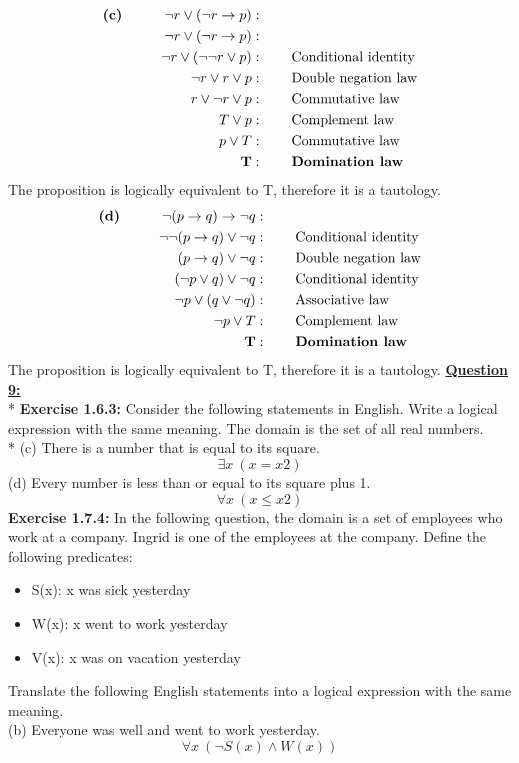 \documentclass[12pt, letterpaper, twoside]{article}
\begin{document}
\begin{align*}
\text{\textbf{(c)}} \quad\qquad \neg{r} \lor (\neg{r} \to p) &:\\
\neg{r} \lor (\neg{r} \to p) &:\\
\neg{r} \lor (\neg{\neg{r}} \lor p)		&:\qquad \text{Conditional identity}\\
\neg{r} \lor r \lor p			&:\qquad \text{Double negation law}\\
r \lor \neg{r} \lor p			&:\qquad \text{Commutative law}\\
T \lor p				&:\qquad \text{Complement law}\\
p \lor T				&:\qquad \text{Commutative law}\\
\text{\textbf{T}}				&:\qquad \text{\textbf{Domination law}}\\
\end{align*}
\noindent The proposition is logically equivalent to T, therefore it is a tautology.
\begin{align*}
\text{\textbf{(d)}}\quad\qquad \neg{(}p \to q) \to \neg{q}&:\\
\neg{\neg{(}}p \to q) \lor \neg{q}		&:\qquad \text{Conditional identity}\\
(p \to q) \lor \neg{q}			&:\qquad \text{Double negation law}\\
(\neg{p} \lor q) \lor \neg{q}		&:\qquad \text{Conditional identity}\\
\neg{p} \lor (q \lor \neg{q})		&:\qquad \text{Associative law}\\
\neg{p} \lor T				&:\qquad \text{Complement law}\\
\text{\textbf{T}}				&:\qquad \text{\textbf{Domination law}}\\
\end{align*}
\noindent The proposition is logically equivalent to T, therefore it is a tautology.
\newpage
\noindent \underline{\textbf{Question 9:}}\\*
\textbf{Exercise 1.6.3:}
Consider the following statements in English. Write a logical expression with the same meaning. The domain is the set of all real numbers.\\*
\break
\noindent(c) There is a number that is equal to its square.
\[\exists x\ (x = x2)\]
(d) Every number is less than or equal to its square plus 1.
\[\forall x\ (x \leq x2)\]
\noindent\textbf{Exercise 1.7.4:}
In the following question, the domain is a set of employees who work at a company. Ingrid is one of the employees at the company. Define the following predicates:
\begin{itemize}
\item S(x): x was sick yesterday
\item W(x): x went to work yesterday
\item V(x): x was on vacation yesterday
\end{itemize}
Translate the following English statements into a logical expression with the same meaning.\\
\break
(b) Everyone was well and went to work yesterday.
\[\forall x\ (\neg{S}(x) \land W(x))\]
\end{document}
